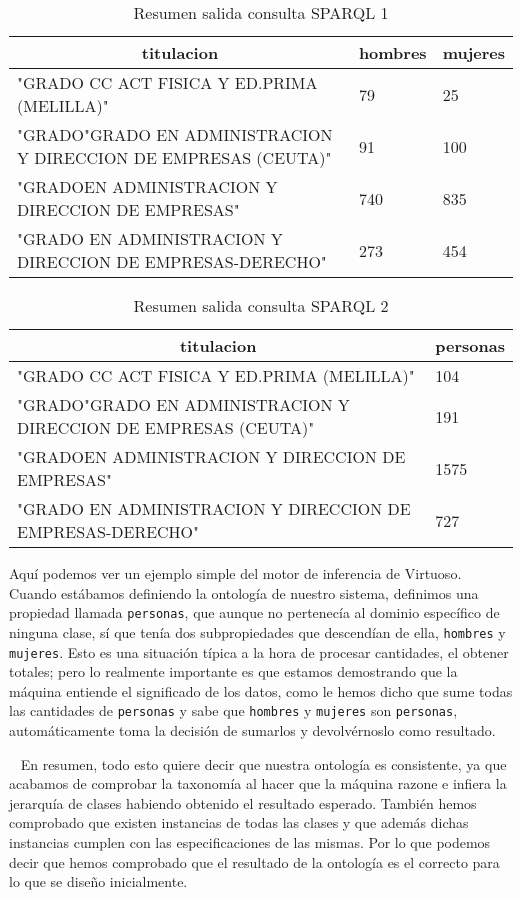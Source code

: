 \begin{table}[!ht]
	\centering
	\begin{tabular}{|p{}|p{}|p{}|}
		\hline
		\multicolumn{1}{|c|}{\textbf{titulacion}} & \multicolumn{1}{c|}{\textbf{hombres}} & \multicolumn{1}{c|}{\textbf{mujeres}} \\ \hline
		"GRADO CC ACT FISICA Y ED.PRIMA (MELILLA)" & 79 & 25 \\ \hline
		"GRADO"GRADO EN ADMINISTRACION Y DIRECCION DE EMPRESAS (CEUTA)" & 91 & 100 \\ \hline
		"GRADOEN ADMINISTRACION Y DIRECCION DE EMPRESAS" & 740 & 835 \\ \hline
		"GRADO EN ADMINISTRACION Y DIRECCION DE EMPRESAS-DERECHO" & 273 & 454 \\ \hline
	\end{tabular}
	\label{salida_consulta_1}
	\caption{Resumen salida consulta SPARQL 1}
\end{table}

\begin{table}[]
	\centering
	\begin{tabular}{|p{}|p{}|}
		\hline
		\multicolumn{1}{|c|}{\textbf{titulacion}} & \multicolumn{1}{c|}{\textbf{personas}} \\ \hline
		"GRADO CC ACT FISICA Y ED.PRIMA (MELILLA)" & 104 \\ \hline
		"GRADO"GRADO EN ADMINISTRACION Y DIRECCION DE EMPRESAS (CEUTA)" & 191 \\ \hline
		"GRADOEN ADMINISTRACION Y DIRECCION DE EMPRESAS" & 1575 \\ \hline
		"GRADO EN ADMINISTRACION Y DIRECCION DE EMPRESAS-DERECHO" & 727 \\ \hline
	\end{tabular}
	\label{salida_consulta_2}
	\caption{Resumen salida consulta SPARQL 2}
\end{table}

Aquí podemos ver un ejemplo simple del motor de inferencia de Virtuoso. Cuando estábamos definiendo la ontología de nuestro sistema, definimos una propiedad llamada {\tt personas}, que aunque no pertenecía al dominio específico de ninguna clase, sí que tenía dos subpropiedades que descendían de ella, {\tt hombres} y {\tt mujeres}. Esto es una situación típica a la hora de procesar cantidades, el obtener totales; pero lo realmente importante es que estamos demostrando que la máquina entiende el significado de los datos, como le hemos dicho que sume todas las cantidades de {\tt personas} y sabe que {\tt hombres} y {\tt mujeres} son {\tt personas}, automáticamente toma la decisión de sumarlos y devolvérnoslo como resultado.
\bigskip

\newpage \
\newpage
En resumen, todo esto quiere decir que nuestra ontología es consistente, ya que acabamos de comprobar la taxonomía al hacer que la máquina razone e infiera la jerarquía de clases habiendo obtenido el resultado esperado. También hemos comprobado que existen instancias de todas las clases y que además dichas instancias cumplen con las especificaciones de las mismas. Por lo que podemos decir que hemos comprobado que el resultado de la ontología es el correcto para lo que se diseño inicialmente.